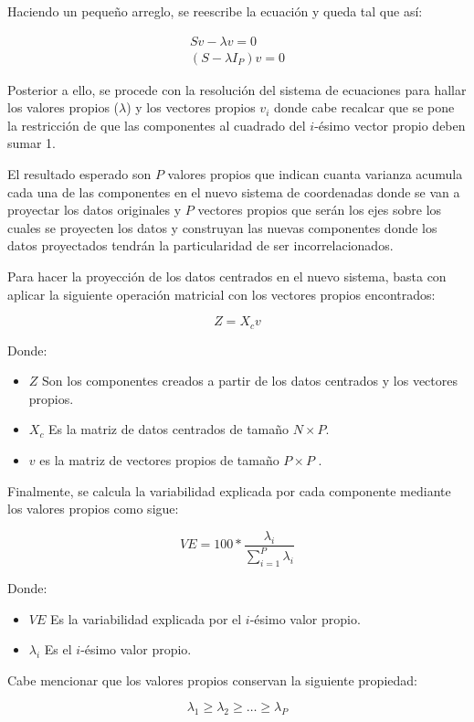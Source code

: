 \documentclass[11pt, letterpaper]{article}
\begin{document}
Haciendo un pequeño arreglo, se reescribe la ecuación y queda tal que así:

$$
\begin{matrix}
	Sv-\lambda v = 0 \\
	(S-\lambda I_P)v = 0	
\end{matrix}
$$

Posterior a ello, se procede con la resolución del sistema de ecuaciones para hallar los valores propios ($\lambda$) y los vectores propios $v_i$ donde cabe recalcar que se pone la restricción de que las componentes al cuadrado del $i$-ésimo vector propio deben sumar 1.

El resultado esperado son $P$ valores propios que indican cuanta varianza acumula cada una de las componentes en el nuevo sistema de coordenadas donde se van a proyectar los datos originales y $P$ vectores propios que serán los ejes sobre los cuales se proyecten los datos y construyan las nuevas componentes donde los datos proyectados tendrán la particularidad de ser incorrelacionados.

Para hacer la proyección de los datos centrados en el nuevo sistema, basta con aplicar la siguiente operación matricial con los vectores propios encontrados:

$$Z = X_cv$$

Donde: 
\begin{itemize}
	\item $Z$ Son los componentes creados a partir de los datos centrados y los vectores propios.
	\item $X_c$ Es la matriz de datos centrados de tamaño $N \times P$.
	\item $v$ es la matriz de vectores propios de tamaño $P \times P$ .
\end{itemize}

Finalmente, se calcula la variabilidad explicada por cada componente mediante los valores propios como sigue:

$$VE = 100*\frac{\lambda_i}{\sum_{i = 1}^P{\lambda_i}}$$

Donde: 
\begin{itemize}
	\item $VE$ Es la variabilidad explicada por el $i$-ésimo valor propio.
	\item $\lambda_i$ Es el $i$-ésimo valor propio.
\end{itemize}

Cabe mencionar que los valores propios conservan la siguiente propiedad:

$$\lambda_1 \geq \lambda_2 \geq \dots \geq \lambda_P$$
\end{document}
